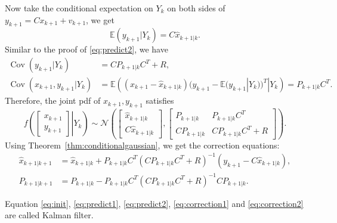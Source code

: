\documentclass{article}
\DeclareMathOperator{\Cov}{Cov}
\begin{document}
\begin{enumerate}
    Now take the conditional expectation on $Y_k$ on both sides of $y_{k+1} = Cx_{k+1} + v_{k+1}$, we get
    \begin{displaymath}
      \mathbb E(y_{k+1}|Y_k) = C \hat x_{k+1|k}. 
    \end{displaymath}
    Similar to the proof of \eqref{eq:predict2}, we have
    \begin{align*}
      \Cov(y_{k+1}|Y_k) &= CP_{k+1|k}C^T + R,\\ 
      \Cov(x_{k+1},y_{k+1}|Y_k)&=\mathbb E\left(  (x_{k+1}- \hat x_{k+1|k})(y_{k+1}- \mathbb E(y_{k+1}|Y_k) )^T|Y_k\right) = P_{k+1|k}C^T.
    \end{align*}
    Therefore, the joint pdf of $x_{k+1},y_{k+1}$ satisfies
    \begin{displaymath}
      f\left(   \left. \begin{bmatrix}x_{k+1}\\y_{k+1}\end{bmatrix} \right|Y_k \right)\sim\mathcal N\left( \begin{bmatrix}\hat x_{k+1|k}\\C\hat x_{k+1|k}\end{bmatrix}, \begin{bmatrix}P_{k+1|k}&P_{k+1|k}C^T\\CP_{k+1|k}&CP_{k+1|k}C^T + R\end{bmatrix} \right).
    \end{displaymath}
    Using Theorem~\ref{thm:conditionalgaussian}, we get the correction equations:
    \begin{align}
      \label{eq:correction1}
      \hat x_{k+1|k+1} &= \hat x_{k+1|k} + P_{k+1|k}C^T(CP_{k+1|k}C^T+R)^{-1}(y_{k+1} - C\hat x_{k+1|k}),\\
      \label{eq:correction2}
      P_{k+1|k+1} &= P_{k+1|k} - P_{k+1|k}C^T(CP_{k+1|k}C^T+R)^{-1}CP_{k+1|k}.
    \end{align}
\end{enumerate}
Equation \eqref{eq:init}, \eqref{eq:predict1}, \eqref{eq:predict2}, \eqref{eq:correction1} and \eqref{eq:correction2} are called Kalman filter.
\end{document}
